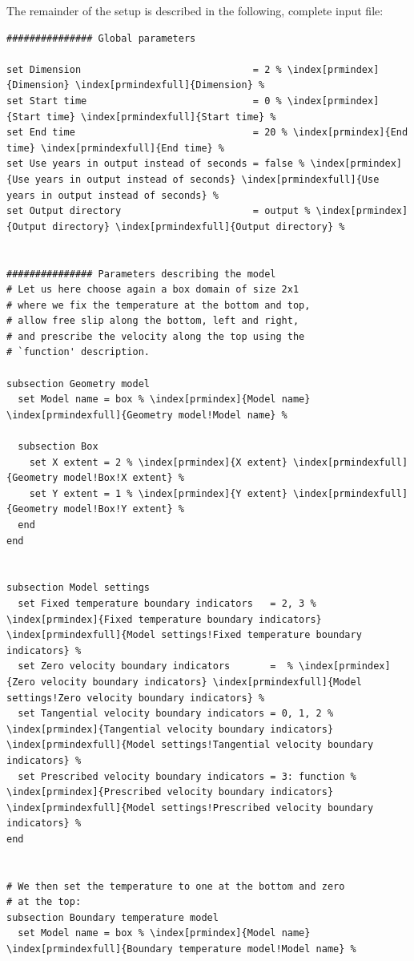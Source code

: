\documentclass{article}
\begin{document}
The remainder of the setup is described in the following, complete input file:
\begin{lstlisting}[frame=single,language=prmfile,escapechar=\%]
############### Global parameters

set Dimension                              = 2 % \index[prmindex]{Dimension} \index[prmindexfull]{Dimension} %
set Start time                             = 0 % \index[prmindex]{Start time} \index[prmindexfull]{Start time} %
set End time                               = 20 % \index[prmindex]{End time} \index[prmindexfull]{End time} %
set Use years in output instead of seconds = false % \index[prmindex]{Use years in output instead of seconds} \index[prmindexfull]{Use years in output instead of seconds} %
set Output directory                       = output % \index[prmindex]{Output directory} \index[prmindexfull]{Output directory} %


############### Parameters describing the model
# Let us here choose again a box domain of size 2x1
# where we fix the temperature at the bottom and top,
# allow free slip along the bottom, left and right,
# and prescribe the velocity along the top using the
# `function' description.

subsection Geometry model
  set Model name = box % \index[prmindex]{Model name} \index[prmindexfull]{Geometry model!Model name} %

  subsection Box
    set X extent = 2 % \index[prmindex]{X extent} \index[prmindexfull]{Geometry model!Box!X extent} %
    set Y extent = 1 % \index[prmindex]{Y extent} \index[prmindexfull]{Geometry model!Box!Y extent} %
  end
end


subsection Model settings
  set Fixed temperature boundary indicators   = 2, 3 % \index[prmindex]{Fixed temperature boundary indicators} \index[prmindexfull]{Model settings!Fixed temperature boundary indicators} %
  set Zero velocity boundary indicators       =  % \index[prmindex]{Zero velocity boundary indicators} \index[prmindexfull]{Model settings!Zero velocity boundary indicators} %
  set Tangential velocity boundary indicators = 0, 1, 2 % \index[prmindex]{Tangential velocity boundary indicators} \index[prmindexfull]{Model settings!Tangential velocity boundary indicators} %
  set Prescribed velocity boundary indicators = 3: function % \index[prmindex]{Prescribed velocity boundary indicators} \index[prmindexfull]{Model settings!Prescribed velocity boundary indicators} %
end


# We then set the temperature to one at the bottom and zero
# at the top:
subsection Boundary temperature model
  set Model name = box % \index[prmindex]{Model name} \index[prmindexfull]{Boundary temperature model!Model name} %


\end{lstlisting}
\end{document}
